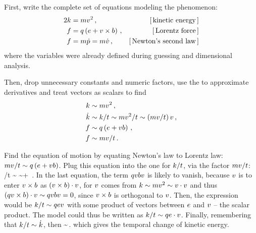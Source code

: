 First, write the complete set of equations modeling the phenomenon:
%
\begin{align*}
  2k &= mv^2\,,                                 &[\,\text{kinetic energy}\,] \\
  f &= q\left({e + v\times b}\right)\,, &[\,\text{Lorentz force}\,] \\
  f &= m\dot{p} = m\dot{v}\,,                 &[\,\text{Newton's second law}\,]
\end{align*}
%
where the variables were already defined during guessing and dimensional analysis. 

Then, drop unnecessary constants and numeric factors, use the  to approximate derivatives and treat vectors as scalars to find
%
~
%
\begin{align*}
  k    &\sim mv^2\,, \\
  \dot{k} &\sim k/t \sim mv^2/t \sim \left({mv/t}\right)v\,, \\
  f   &\sim q\left({e + vb}\right)\,, \\
  f   &\sim mv/t\,.
\end{align*}

Find the equation of motion by equating Newton's law to Lorentz law: $mv/t\sim q\left({e + vb}\right)$. Plug this equation into the one for $k/t$, via the factor $mv/t$:
%
\beq
  \ekin/t \sim \echarge\parth{\efield + \vel\mfield}\vel 
          \sim \echarge\efield\vel + \echarge\vel\mfield\vel\,.
\eeq
%
In the last equation, the term $qvbv$ is likely to vanish, because $v$ is to enter $v\times b$ as $\left({v\times b}\right)\cdot v$, for $v$ comes from $k\sim mv^2\sim v\cdot v$ and thus
$\left({qv\times b}\right)\cdot v\sim qvbv = 0$, since $v\times b$ is orthogonal to $v$. Then, the expression would be $k/t\sim qev$ with some product of vectors between $e$ and $v$ -- the scalar product. The model could thus be written as $k/t\sim qe\cdot v$. Finally, remembering that $k/t\sim\dot{k}$, then
%
\beq
  \dt\ekin\sim\echarge\efield\iprod\vel\,.
\eeq
%
which gives the temporal change of kinetic energy.

